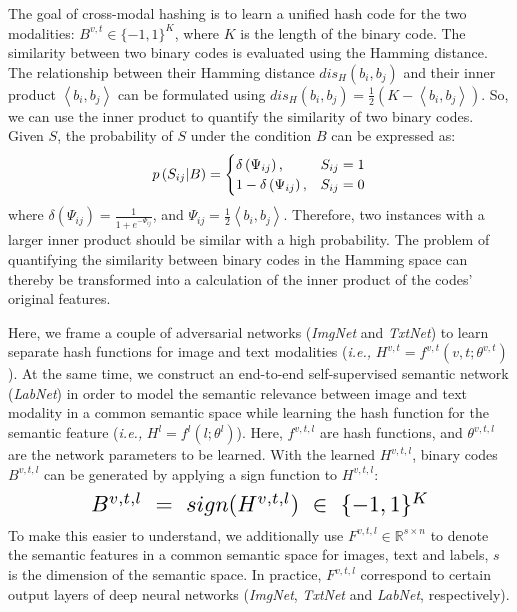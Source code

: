 \documentclass[10pt,twocolumn,letterpaper]{article}
\begin{document}
The goal of cross-modal hashing is to learn a unified hash code for the two modalities: $B^{v,t} \in \{-1,1\}^{K}$, where $K$ is the length of the binary code. The similarity between two binary codes is evaluated using the Hamming distance. The relationship between their Hamming distance $dis_{H}(b_{i},b_{j})$ and their inner product $\left<b_{i},b{_j}\right>$ can be formulated using $dis_{H}(b_{i},b_{j}) = \frac{1}{2}(K-\left<b_{i},b{_j}\right>)$.
So, we can use the inner product to quantify the similarity of two binary codes. Given $S$, the probability of $S$ under the condition $B$ can be expressed as:
\vspace{-0.2cm}
\begin{equation} \label{eq:loglikehood}
\begin{aligned}
p\left( { S }_{ ij }| B \right) =\begin{cases} \delta \left( { \Psi  }_{ ij } \right) \text{,}& { S }_{ ij }=1 \\ 1-\delta \left( { \Psi  }_{ ij } \right) \text{,}& { S }_{ ij }=0 \end{cases}
\end{aligned}
\vspace{-0.1cm}
\end{equation}
where $\delta \left( {\Psi}_{ ij } \right)=\frac{1}{1+e^{-{\Psi }_{ ij }}}$, and ${\Psi}_{ij}=\frac{1}{2}\left<b_{i},b{_j}\right>$. Therefore, two instances with a larger inner product should be similar with a high probability. The problem of quantifying the similarity between binary codes in the Hamming space can thereby be transformed into a calculation of the inner product of the codes' original features.

Here, we frame a couple of adversarial networks (\emph{ImgNet} and \emph{TxtNet}) to learn separate hash functions for image and text modalities (\emph{i.e.,} $H^{v,t}=f^{v,t}(v,t;\theta^{v,t})$). At the same time, we construct an end-to-end self-supervised semantic network (\emph{LabNet}) in order to model the semantic relevance between image and text modality in a common semantic space while learning the hash function for the semantic feature (\emph{i.e.,} $H^{l}=f^{l}(l;\theta^{l})$). Here, $f^{v,t,l}$ are hash functions, and $\theta^{v,t,l}$ are the network parameters to be learned. With the learned $H^{v,t,l}$, binary codes $B^{v,t,l}$ can be generated by applying a sign function to $H^{v,t,l}$:
\vspace{-0.1cm}
\begin{equation} \label{eq: hashing code}
\begin{aligned}
\resizebox{0.7\hsize}{!}{$B^{v,t,l} \ = \ sign(H^{v,t,l})\ \in \ \{-1,1\}^{K}$}\\
\end{aligned}
\vspace{-0.1cm}
\end{equation}
To make this easier to understand, we additionally use $F^{v,t,l} \in \mathbb{R}^{s\times n}$ to denote the semantic features in a common semantic space for images, text and labels, $s$ is the dimension of the semantic space. In practice, $F^{v,t,l}$ correspond to certain output layers of deep neural networks (\emph{ImgNet}, \emph{TxtNet} and \emph{LabNet}, respectively).
\vspace{-0.1cm}
\end{document}
